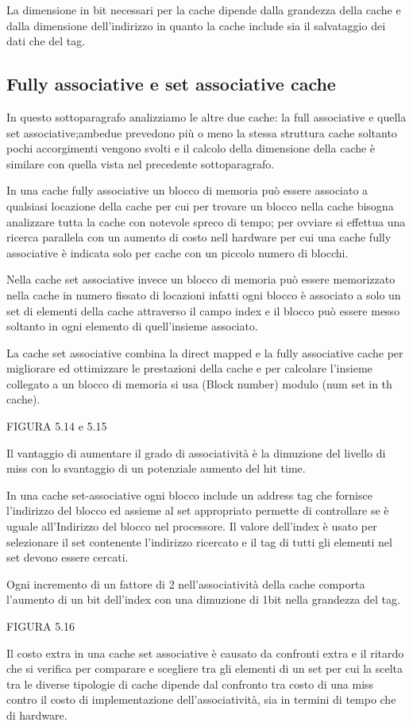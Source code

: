 La dimensione in bit necessari per la cache dipende dalla grandezza della cache e dalla dimensione
dell'indirizzo in quanto la cache include sia il salvataggio dei dati che del tag.



\subsection{Fully associative e set associative cache}
In questo sottoparagrafo analizziamo le altre due cache: la full associative e quella
set associative;ambedue prevedono più o meno la stessa struttura cache soltanto
pochi accorgimenti vengono svolti e il calcolo della dimensione della cache è
similare con quella vista nel precedente sottoparagrafo.

In una cache fully associative un blocco di memoria può essere associato a qualsiasi
locazione della cache per cui per trovare un blocco nella cache bisogna analizzare
tutta la cache con notevole spreco di tempo; per ovviare si effettua una ricerca
parallela con un aumento di costo nell hardware per cui una cache fully associative
è indicata solo per cache con un piccolo numero di blocchi.

Nella cache set associative invece un blocco di memoria può essere memorizzato
nella cache in numero fissato di locazioni infatti ogni blocco è associato a solo
un set di elementi della cache attraverso il campo index e il blocco può essere
messo soltanto in ogni elemento di quell'insieme associato.

La cache set associative combina la direct mapped e la fully associative cache per
migliorare ed ottimizzare le prestazioni della cache e per calcolare l'insieme
collegato a un blocco di memoria si usa (Block number) modulo (num set in th cache).

FIGURA 5.14 e 5.15

Il vantaggio di aumentare il grado di associatività è la dimuzione del livello di miss
con lo svantaggio di un potenziale aumento del hit time.

In una cache set-associative ogni blocco include un address tag che fornisce l'indirizzo
del blocco ed assieme al set appropriato permette di controllare se è uguale all'Indirizzo
del blocco nel processore.\newline
Il valore dell'index è usato per selezionare il set contenente l'indirizzo ricercato
e il tag di tutti gli elementi nel set devono essere cercati.

Ogni incremento di un fattore di 2 nell'associatività della cache comporta l'aumento
di un bit dell'index con una dimuzione di 1bit nella grandezza del tag.

FIGURA 5.16

Il costo extra in una cache set associative è causato da confronti extra e il ritardo
che si verifica per comparare e scegliere tra gli elementi di un set per cui la scelta
tra le diverse tipologie di cache dipende dal confronto tra costo di una miss contro
il costo di implementazione dell'associatività, sia in termini di tempo che di hardware.
